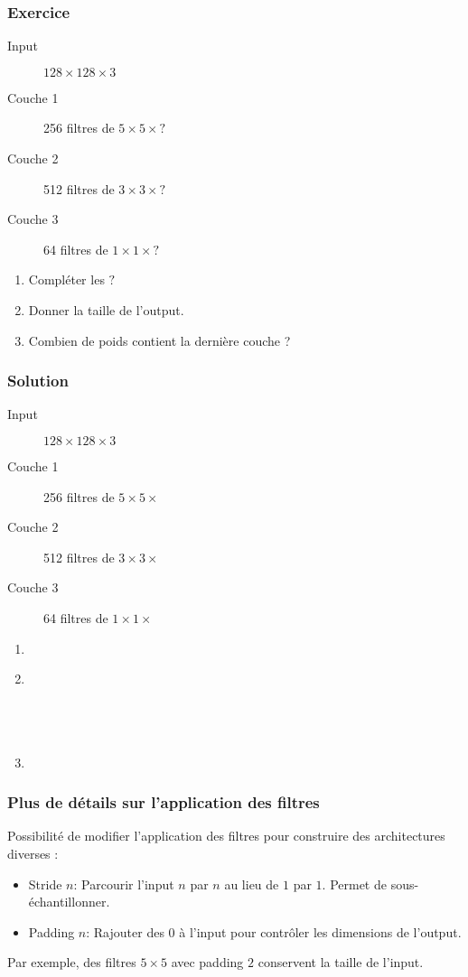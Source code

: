 \documentclass{formation}
\begin{document}
\begin{frame}
  \frametitle{Exercice}
  \begin{description}
  \item[Input] $128 \times 128 \times 3$
  \item[Couche 1] 256 filtres de $5 \times 5 \times ?$
  \item[Couche 2] 512 filtres de $3 \times 3 \times ?$
  \item[Couche 3] 64 filtres de $1 \times 1 \times ?$
  \end{description}
  \begin{enumerate}
  \item Compléter les $?$
  \item Donner la taille de l'output.
  \item Combien de poids contient la dernière couche ?
  \end{enumerate}
\end{frame}

\begin{frame}
  \frametitle{Solution}
  \begin{description}
  \item[Input] $128 \times 128 \times 3$
  \item[Couche 1] 256 filtres de $5 \times 5 \times $
  \item[Couche 2] 512 filtres de $3 \times 3 \times $
  \item[Couche 3] 64 filtres de $1 \times 1 \times $
  \end{description}
  \begin{enumerate}
  \item {}
  \item {}\\
    \\
    \\
    \\
  \item {}
  \end{enumerate}
\end{frame}

\begin{frame}
  \frametitle{Plus de détails sur l'application des filtres}
  Possibilité de modifier l'application des filtres pour construire
  des architectures diverses :
  \begin{itemize}
  \item Stride $n$: Parcourir l'input $n$ par $n$ au lieu de $1$ par
    $1$. Permet de sous-échantillonner.
  \item Padding $n$: Rajouter des $0$ à l'input pour contrôler les
    dimensions de l'output.
  \end{itemize}
  Par exemple, des filtres $5\times5$ avec padding $2$ conservent la taille
  de l'input.
\end{frame}
\end{document}
